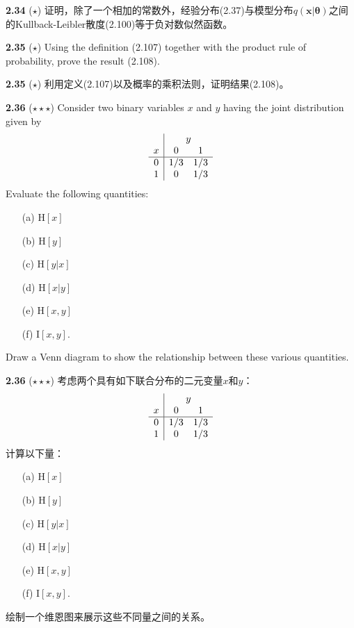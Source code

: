 \documentclass{article}
\begin{document}
\textbf{2.34} ($\star$) 证明，除了一个相加的常数外，经验分布(2.37)与模型分布$q(\mathbf{x}|\boldsymbol{\theta})$之间的Kullback-Leibler散度(2.100)等于负对数似然函数。

\textbf{2.35} ($\star$) Using the definition (2.107) together with the product rule of probability, prove the result (2.108).

\textbf{2.35} ($\star$) 利用定义(2.107)以及概率的乘积法则，证明结果(2.108)。

\textbf{2.36} ($\star\star\star$) Consider two binary variables $x$ and $y$ having the joint distribution given by
\[
\begin{array}{c|cc}
 & \multicolumn{2}{c}{y} \\
x & 0 & 1 \\
\hline
0 & 1/3 & 1/3 \\
1 & 0 & 1/3 \\
\end{array}
\]
Evaluate the following quantities:
\begin{itemize}
    \item[(a)] $\mathrm{H}[x]$
    \item[(b)] $\mathrm{H}[y]$
    \item[(c)] $\mathrm{H}[y|x]$
    \item[(d)] $\mathrm{H}[x|y]$
    \item[(e)] $\mathrm{H}[x, y]$
    \item[(f)] $\mathrm{I}[x, y]$.
\end{itemize}
Draw a Venn diagram to show the relationship between these various quantities.

\textbf{2.36} ($\star\star\star$) 考虑两个具有如下联合分布的二元变量$x$和$y$：
\[
\begin{array}{c|cc}
 & \multicolumn{2}{c}{y} \\
x & 0 & 1 \\
\hline
0 & 1/3 & 1/3 \\
1 & 0 & 1/3 \\
\end{array}
\]
计算以下量：
\begin{itemize}
    \item[(a)] $\mathrm{H}[x]$
    \item[(b)] $\mathrm{H}[y]$
    \item[(c)] $\mathrm{H}[y|x]$
    \item[(d)] $\mathrm{H}[x|y]$
    \item[(e)] $\mathrm{H}[x, y]$
    \item[(f)] $\mathrm{I}[x, y]$.
\end{itemize}
绘制一个维恩图来展示这些不同量之间的关系。
\end{document}
